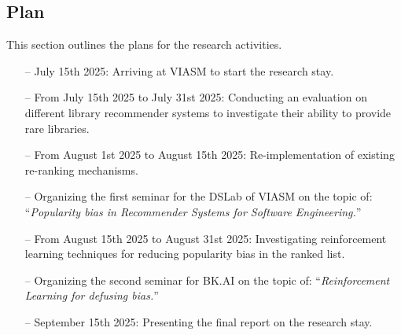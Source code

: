 \subsection{Plan}

This section outlines the plans for the research activities. %



\begin{itemize}
\item[--] July 15th 2025: Arriving at VIASM to start the research stay.
\item[--] From July 15th 2025 to July 31st 2025: Conducting an evaluation on different library recommender systems to investigate their ability to provide rare libraries.
\item[--] From August 1st 2025 to August 15th 2025: Re-implementation of existing re-ranking mechanisms.
\item[--] Organizing the first seminar for the DSLab of VIASM on the topic of: ``\emph{Popularity bias in Recommender Systems for Software Engineering.}''
\item[--] From August 15th 2025 to August 31st 2025: Investigating reinforcement learning techniques for reducing popularity bias in the ranked list.
\item[--] Organizing the second seminar for BK.AI on the topic of: ``\emph{Reinforcement Learning for defusing bias.}''
\item[--] September 15th 2025: Presenting the final report on the research stay.
\end{itemize}



